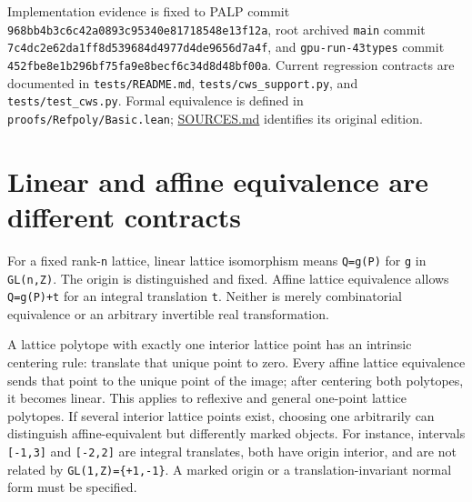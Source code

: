 \documentclass[11pt,a4paper,oneside]{report}
\begin{document}
Implementation evidence is fixed to PALP commit
\texttt{968bb4b3\allowbreak{}c6c42a08\allowbreak{}93c95340\allowbreak{}e8171854\allowbreak{}8e13f12a},
root archived \texttt{main} commit
\texttt{7c4dc2e6\allowbreak{}2da1ff8d\allowbreak{}539684d4\allowbreak{}977d4de9\allowbreak{}656d7a4f},
and \texttt{gpu-\allowbreak{}run-\allowbreak{}43types} commit
\texttt{452fbe8e\allowbreak{}1b296bf7\allowbreak{}5fa9e8be\allowbreak{}cf6c34d8\allowbreak{}d48bf00a}.
Current regression contracts are documented in
\texttt{tests/\allowbreak{}README.\allowbreak{}md},
\texttt{tests/\allowbreak{}cws\_\allowbreak{}support.\allowbreak{}py},
and \texttt{tests/\allowbreak{}test\_\allowbreak{}cws.\allowbreak{}py}.
Formal equivalence is defined in
\texttt{proofs/\allowbreak{}Refpoly/\allowbreak{}Basic.\allowbreak{}lean};
\href{../../proofs/SOURCES.md}{SOURCES.md} identifies its original
edition.

\section{Linear and affine equivalence are different
contracts}\label{normal-forms-and-classification--linear-and-affine-equivalence-are-different-contracts}

For a fixed rank-\texttt{n} lattice, linear lattice isomorphism means
\texttt{Q=\allowbreak{}g(\allowbreak{}P)} for \texttt{g} in
\texttt{GL(\allowbreak{}n,\allowbreak{}Z)}. The origin is distinguished
and fixed. Affine lattice equivalence allows
\texttt{Q=\allowbreak{}g(\allowbreak{}P)\allowbreak{}+t} for an integral
translation \texttt{t}. Neither is merely combinatorial equivalence or
an arbitrary invertible real transformation.

A lattice polytope with exactly one interior lattice point has an
intrinsic centering rule: translate that unique point to zero. Every
affine lattice equivalence sends that point to the unique point of the
image; after centering both polytopes, it becomes linear. This applies
to reflexive and general one-point lattice polytopes. If several
interior lattice points exist, choosing one arbitrarily can distinguish
affine-equivalent but differently marked objects. For instance,
intervals \texttt{[\allowbreak{}-\allowbreak{}1,\allowbreak{}3]} and
\texttt{[\allowbreak{}-\allowbreak{}2,\allowbreak{}2]} are integral
translates, both have origin interior, and are not related by
\texttt{GL(\allowbreak{}1,\allowbreak{}Z)\allowbreak{}=\allowbreak{}\{+1,\allowbreak{}-\allowbreak{}1\}}.
A marked origin or a translation-invariant normal form must be
specified.
\end{document}
